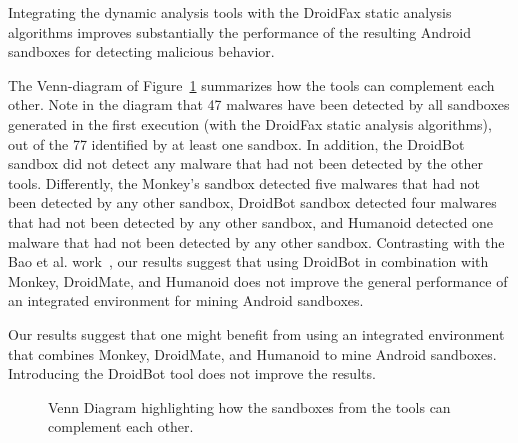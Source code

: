 \begin{finding}
  Integrating the dynamic analysis tools
  with the DroidFax static analysis algorithms
  improves substantially the performance
  of the resulting Android sandboxes for
  detecting malicious behavior. 
\end{finding}
 
The Venn-diagram of Figure~\ref{fig:venn-plot1}
summarizes how the tools can complement each other.
Note in the diagram that 47 malwares have been detected by all sandboxes generated in the first execution (with the DroidFax static analysis algorithms), out of the 77 identified by at least one sandbox. In addition, the DroidBot sandbox did not detect any malware that had not been detected by the other tools. Differently, the Monkey's sandbox detected five malwares that had not been detected by any other sandbox, DroidBot sandbox detected four malwares that had not been detected by any other sandbox, and Humanoid detected one malware that had not been detected by any other sandbox. Contrasting with the Bao et al. work~\cite{DBLP:conf/wcre/BaoLL18},
our results suggest that using DroidBot in combination with Monkey, DroidMate, and Humanoid does not improve the general performance of an integrated environment for mining
Android sandboxes.  

\begin{finding}
  Our results suggest that one might benefit from using  an integrated
  environment that combines Monkey, DroidMate, and Humanoid to
  mine Android sandboxes. Introducing the DroidBot 
  tool does not improve the results.
\end{finding}


\begin{figure}[htb]
  \caption{Venn Diagram highlighting how the sandboxes from the tools can
    complement each other.}
  \label{fig:venn-plot1}
\end{figure}


